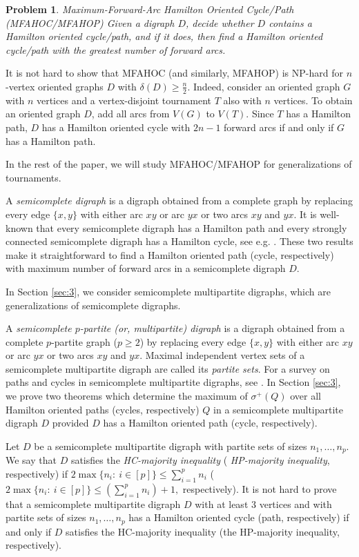 \documentclass{article}
\newtheorem{problem}{Problem}
\newcommand{\GG}[1]{{#1}}
\newcommand{\GGnn}[1]{{#1}}
\newcommand{\2}{\vspace{0.2cm}}
\begin{document}
\begin{problem}{\sc Maximum-Forward-Arc Hamilton Oriented Cycle/Path (MFAHOC/MFAHOP)}
	Given a digraph $D$, \GGnn{decide whether $D$ contains a Hamilton oriented cycle/path, and if it does, then}
	find a Hamilton oriented cycle/path with the greatest number of forward arcs.
\end{problem}

\GGnn{It is not hard to show that MFAHOC (and similarly, MFAHOP) is {\sf NP}-hard for $n$-vertex oriented graphs $D$ with $\delta(D) \ge \frac{n}{2}$. 
Indeed, consider an oriented graph $G$ with $n$ vertices and a vertex-disjoint tournament $T$ also with $n$ vertices. To obtain an oriented graph $D$, add all arcs from $V(G)$ to $V(T)$. Since $T$ has a Hamilton path, $D$ has a Hamilton oriented cycle with $2n-1$ forward arcs if and only if $G$ has a Hamilton path.}

\GGnn{In the rest of the paper, we will study MFAHOC/MFAHOP for generalizations of tournaments.}
\GG{A {\em semicomplete digraph} is a digraph obtained from a complete graph by replacing every edge $\{x,y\}$ with either arc $xy$ or arc $yx$ or two arcs $xy$ and $yx.$
It is well-known that every semicomplete digraph has a Hamilton path and every strongly connected semicomplete digraph has a Hamilton cycle, see e.g. \cite{BG18}. These two results make it straightforward to find a Hamilton oriented path (cycle, respectively) with maximum number of forward arcs in a semicomplete digraph $D.$

In Section \ref{sec:3}, we consider semicomplete multipartite digraphs, which are generalizations of semicomplete digraphs.} A {\em semicomplete $p$-partite (or, multipartite) digraph} is a digraph obtained from a complete $p$-partite graph ($p\ge 2$) by replacing every edge $\{x,y\}$ with either arc $xy$ or arc $yx$ or two arcs $xy$ and $yx.$ Maximal independent vertex sets of a semicomplete multipartite digraph are called its {\em partite sets}.  For a survey on paths and cycles in semicomplete multipartite digraphs, see \cite{Y18}.
In Section \ref{sec:3}, we prove two theorems which determine  the maximum of \GGnn{$\sigma^+(Q)$} over all Hamilton oriented paths (cycles, respectively) $Q$ in a semicomplete multipartite digraph $D$ provided $D$ has a Hamilton oriented path (cycle, respectively).
	
Let $D$ be a semicomplete multipartite digraph with partite sets of sizes $n_1,\dots ,n_p$. We say that $D$ satisfies the {\em HC-majority inequality} ( {\em HP-majority inequality}, respectively) if $2\max\{n_i:\ i\in [p]\} \le \sum_{i=1}^pn_i$ ($2\max\{n_i:\ i\in [p]\}\le (\sum_{i=1}^p n_i)+1,$ respectively). It is not hard to prove that a semicomplete multipartite digraph $D$ \GGnn{with at least 3 vertices and} with partite sets of sizes $n_1,\dots ,n_p$ has a Hamilton oriented cycle (path, respectively) if and only if $D$ satisfies the  HC-majority inequality (the  HP-majority inequality, respectively).
\end{document}
